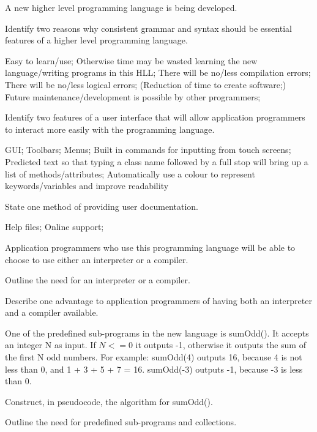 \begin{exercise*}%
A new higher level programming language is being developed.
\begin{parts}
\item Identify two reasons why consistent grammar and syntax should be essential features of a higher level programming language.
\begin{solution}
Easy to learn/use;
Otherwise time may be wasted learning the new language/writing programs in this HLL;
There will be no/less compilation errors;
There will be no/less logical errors;
(Reduction of time to create software;)
Future maintenance/development is possible by other programmers;
\end{solution}

\item Identify two features of a user interface that will allow application programmers to interact more easily with the programming language.
\begin{solution}
GUI;
Toolbars;
Menus;
Built in commands for inputting from touch screens;
Predicted text so that typing a class name followed by a full stop will bring up a list of methods/attributes;
Automatically use a colour to represent keywords/variables and improve readability
\end{solution}

\item State one method of providing user documentation.
\begin{solution}
Help files;
Online support;
\end{solution}
\end{parts}
\end{exercise*}


\begin{exercise*}%
Application programmers who use this programming language will be able to choose to use either an interpreter or a compiler.
\begin{parts}
\item Outline the need for an interpreter or a compiler.
\item Describe one advantage to application programmers of having both an interpreter and a compiler available.
\end{parts}
One of the predefined sub-programs in the new language is sumOdd(). It accepts an integer N as input. If $N <= 0$ it outputs -1, otherwise it outputs the sum of the first N odd numbers.
For example:
sumOdd(4) outputs 16, because 4 is not less than 0, and 1 + 3 + 5 + 7 = 16.
sumOdd(-3) outputs -1, because -3 is less than 0.
\begin{parts}
\item Construct, in pseudocode, the algorithm for sumOdd().
\item Outline the need for predefined sub-programs and collections.
\end{parts}
\end{exercise*}

